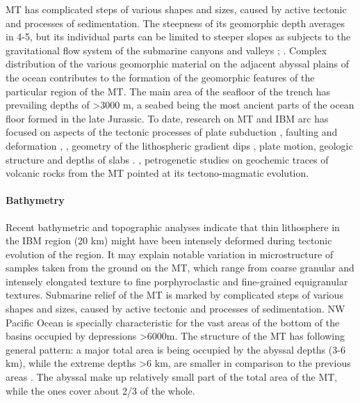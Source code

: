 \documentclass[11pt,a4paper]{report}
\begin{document}
\ac{MT} has complicated steps of various shapes and sizes, caused by active tectonic and processes of sedimentation. The steepness of its geomorphic depth averages in 4-5\degree, but its individual parts can be limited to steeper slopes as subjects to the gravitational flow system of the submarine canyons and valleys\cite{Kawabe1993} \cite{NormarkCarlson2003}; \cite{HarrisWhiteway2011}. Complex distribution of the various geomorphic material on the adjacent abyssal plains of the ocean contributes to the formation of the geomorphic features of the particular region of the \ac{MT}. The main area of the seafloor of the trench has prevailing depths of >3000 m, a seabed being the most ancient parts of the ocean floor formed in the late Jurassic. To date, research on \ac{MT} and \ac{IBM} arc has focused on aspects of the tectonic processes of plate subduction \cite{Faccennaetal2018}, faulting and deformation \cite{Zhouetal2015}, \cite{ZhouLin2018}, geometry of the lithospheric gradient dips \cite{BodineWatts1979}, plate motion, geologic structure and depths of slabs \cite{HilstSeno1993}. \cite{Beccaluvaetal1986}, petrogenetic studies on geochemic traces of volcanic rocks from the \ac{MT} pointed at its tectono-magmatic evolution.

\paragraph{Bathymetry}
Recent bathymetric and topographic analyses \cite{Michibayashietal2007} indicate that thin lithosphere in the \ac{IBM} region (20 km) might have been intensely deformed during tectonic evolution of the region. It may explain notable variation in microstructure of samples taken from the ground on the \ac{MT}, which range from coarse granular and intensely elongated texture to fine porphyroclastic and fine-grained equigranular textures. Submarine relief of the \ac{MT} is marked by complicated steps of various shapes and sizes, caused by active tectonic and processes of sedimentation. NW Pacific Ocean is specially characteristic for the vast areas of the bottom of the basins occupied by depressions >6000m. The structure of the \ac{MT} has following general pattern: a major total area is being occupied by the abyssal depths (3-6 km), while the extreme depths >6 km, are smaller in comparison to the previous areas \cite{UyedaKanamori1979}. The abyssal make up relatively small part of the total area of the \ac{MT}, while the  ones cover about 2/3 of the whole. 
\end{document}
